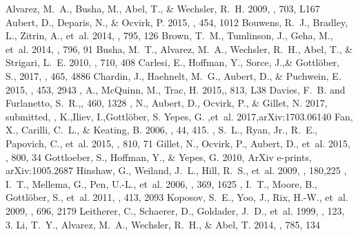 \documentclass[twocolumn]{aastex61}
\begin{document}
\begin{thebibliography}{}

 Alvarez, M.~A., Busha, M., Abel, T., \& Wechsler, R.~H. 2009, \apjl,
  703, L167
 Aubert, D., Deparis, N., \& Ocvirk, P. 2015, \mnras, 454, 1012
 {Bouwens}, R.~J., {Bradley}, L., {Zitrin}, A., {et~al.} 2014, \apj, 795, 126
 {Brown}, T.~M., {Tumlinson}, J., {Geha}, M., {et~al.} 2014, \apj, 796, 91
 {Busha}, M.~T., {Alvarez}, M.~A., {Wechsler}, R.~H., {Abel}, T., \& {Strigari}, L.~E. 2010, \apj, 710, 408
 {Carlesi}, E., {Hoffman}, Y., {Sorce}, J.,\& {Gottlöber}, S., 2017, \mnras, 465, 4886
 {Chardin}, J., {Haehnelt}, M.~G., {Aubert}, D., \& {Puchwein}, E. 2015, \mnras, 453, 2943
, A., {McQuinn}, M., {Trac}, H. 2015,\apjl, 813, L38
 {Davies}, F.~B. and {Furlanetto}, S.~R.,\mnras, 460, 1328
, N., {Aubert}, D., {Ocvirk}, P., \& {Gillet}, N. 2017, submitted,
, K.,{Iliev}, I.,{Gottl{\"o}ber}, S.
	{Yepes}, G. ,{et~al.} 2017,arXiv:1703.06140
 Fan, X., Carilli, C.~L., \& Keating, B. 2006, \araa, 44, 415.
, S.~L., {Ryan}, Jr., R.~E., {Papovich}, C., {et~al.} 2015, \apj, 810, 71
 {Gillet}, N., {Ocvirk}, P., {Aubert}, D., {et~al.} 2015, \apj, 800, 34
 {Gottloeber}, S., {Hoffman}, Y., \& {Yepes}, G. 2010, ArXiv e-prints, arXiv:1005.2687
 {Hinshaw}, G., {Weiland}, J.~L., {Hill}, R.~S., {et~al.} 2009, \apjs, 180,225
, I.~T., {Mellema}, G., {Pen}, U.-L., {et~al.} 2006, \mnras, 369, 1625
, I.~T., {Moore}, B., {Gottl{\"o}ber}, S., {et~al.} 2011, \mnras, 413,
  2093
 {Koposov}, S.~E., {Yoo}, J., {Rix}, H.-W., {et~al.} 2009, \apj, 696, 2179
 Leitherer, C., Schaerer, D., Goldader, J.~D., {et~al.} 1999, \apjs, 123, 3.
 {Li}, T.~Y., {Alvarez}, M.~A., {Wechsler}, R.~H., \& {Abel}, T. 2014, \apj, 785, 134

\end{thebibliography}
\end{document}
